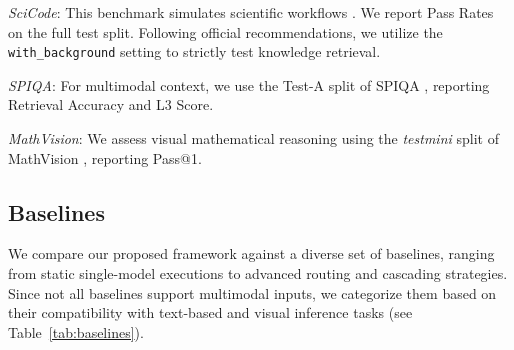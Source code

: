 \documentclass[11pt]{article}
\begin{document}
\noindent\emph{SciCode}: This benchmark simulates scientific workflows \citep{tian2024scicoderesearchcodingbenchmark}. We report Pass Rates on the full test split. Following official recommendations, we utilize the \texttt{with\_background} setting to strictly test knowledge retrieval.

\noindent\emph{SPIQA}: For multimodal context, we use the Test-A split of SPIQA \citep{pramanick2025spiqadatasetmultimodalquestion}, reporting Retrieval Accuracy and L3 Score.

\noindent\emph{MathVision}: We assess visual mathematical reasoning using the \emph{testmini} split of MathVision \citep{wang2024measuringmultimodalmathematicalreasoning}, reporting Pass@1.


\subsection{Baselines}We compare our proposed framework against a diverse set of baselines, ranging from static single-model executions to advanced routing and cascading strategies. Since not all baselines support multimodal inputs, we categorize them based on their compatibility with text-based and visual inference tasks (see Table~\ref{tab:baselines}).

\begin{table}[t]
    \centering
    \caption{Overview of baseline methods and their compatibility with text-based versus multimodal inference tasks ($\checkmark$: Supported; $\times$: Not supported/evaluated).}
    \label{tab:baselines}
\end{table}
\end{document}
